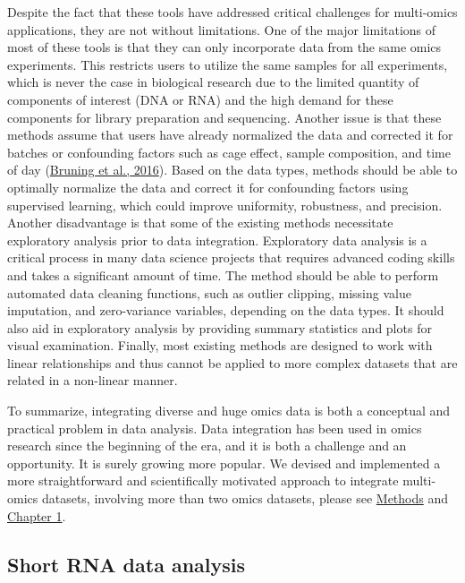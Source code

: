 \documentclass[12pt,twoside]{reedthesis}
\begin{document}
Despite the fact that these tools have addressed critical challenges for
multi-omics applications, they are not without limitations. One of the
major limitations of most of these tools is that they can only
incorporate data from the same omics experiments. This restricts users
to utilize the same samples for all experiments, which is never the case
in biological research due to the limited quantity of components of
interest (DNA or RNA) and the high demand for these components for
library preparation and sequencing. Another issue is that these methods
assume that users have already normalized the data and corrected it for
batches or confounding factors such as cage effect, sample composition,
and time of day (\protect\hyperlink{ref-bruning2016}{Bruning et al., 2016}). Based on the data types, methods should
be able to optimally normalize the data and correct it for confounding
factors using supervised learning, which could improve uniformity,
robustness, and precision. Another disadvantage is that some of the
existing methods necessitate exploratory analysis prior to data
integration. Exploratory data analysis is a critical process in many
data science projects that requires advanced coding skills and takes a
significant amount of time. The method should be able to perform
automated data cleaning functions, such as outlier clipping, missing
value imputation, and zero-variance variables, depending on the data
types. It should also aid in exploratory analysis by providing summary
statistics and plots for visual examination. Finally, most existing
methods are designed to work with linear relationships and thus cannot
be applied to more complex datasets that are related in a non-linear
manner.

To summarize, integrating diverse and huge omics data is both a
conceptual and practical problem in data analysis. Data integration has
been used in omics research since the beginning of the era, and it is
both a challenge and an opportunity. It is surely growing more popular.
We devised and implemented a more straightforward and scientifically
motivated approach to integrate multi-omics datasets, involving more
than two omics datasets, please see \protect\hyperlink{methods}{Methods} and \protect\hyperlink{chapter1}{Chapter
1}.

\hypertarget{short-rna-data-analysis}{%
\subsection*{Short RNA data analysis}\label{short-rna-data-analysis}}
\end{document}
